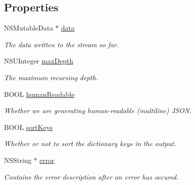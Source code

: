 \subsection*{Properties}
\begin{DoxyCompactItemize}
\item 
NSMutableData $\ast$ \hyperlink{interface_s_b_json_stream_writer_a12523a0a0f27604fa52a5da8e78e1ff3}{data}
\begin{DoxyCompactList}\small\item\em The data written to the stream so far. \item\end{DoxyCompactList}\item 
NSUInteger \hyperlink{interface_s_b_json_stream_writer_a146e7e950ab74a0e766ffd860e454fc9}{maxDepth}
\begin{DoxyCompactList}\small\item\em The maximum recursing depth. \item\end{DoxyCompactList}\item 
BOOL \hyperlink{interface_s_b_json_stream_writer_af43e8bd7170d6128480515f532b7b791}{humanReadable}
\begin{DoxyCompactList}\small\item\em Whether we are generating human-\/readable (multiline) JSON. \item\end{DoxyCompactList}\item 
BOOL \hyperlink{interface_s_b_json_stream_writer_ab206c6844a0fd20307b5dfe881e17bf2}{sortKeys}
\begin{DoxyCompactList}\small\item\em Whether or not to sort the dictionary keys in the output. \item\end{DoxyCompactList}\item 
\hypertarget{interface_s_b_json_stream_writer_af9ad1ac60aaa480f4b4543e42e40fcf2}{
NSString $\ast$ \hyperlink{interface_s_b_json_stream_writer_af9ad1ac60aaa480f4b4543e42e40fcf2}{error}}
\label{interface_s_b_json_stream_writer_af9ad1ac60aaa480f4b4543e42e40fcf2}

\begin{DoxyCompactList}\small\item\em Contains the error description after an error has occured. \item\end{DoxyCompactList}\end{DoxyCompactItemize}


